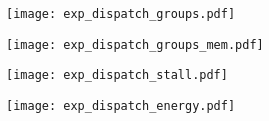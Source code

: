 \begin{table}
    \begin{subfigure}[t]{.5\textwidth}
    \centering
    \texttt{[image: exp\_dispatch\_groups.pdf]}
    \end{subfigure}
    \hfill
    \begin{subfigure}[t]{.5\textwidth}
    \centering
    \texttt{[image: exp\_dispatch\_groups\_mem.pdf]}
    \end{subfigure}
    \begin{subfigure}[t]{.5\textwidth}
    \centering
    \texttt{[image: exp\_dispatch\_stall.pdf]}
    \end{subfigure}
    \hfill
    \begin{subfigure}[t]{.5\textwidth}
    \centering
    \texttt{[image: exp\_dispatch\_energy.pdf]}
    \end{subfigure}
    \label{fig:exp_dispatch_groups}
\end{table}
